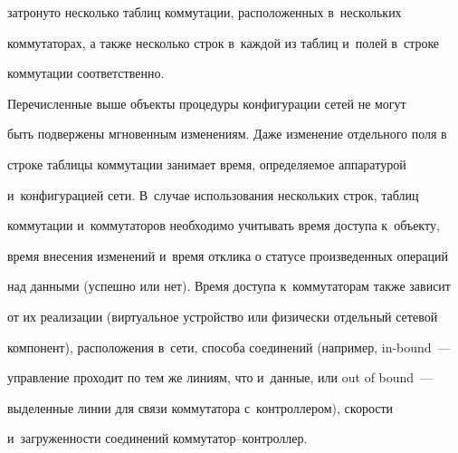 затронуто несколько таблиц коммутации, расположенных в~нескольких 


коммутаторах, а также несколько строк в~каждой из таблиц и~полей в~строке 


коммутации соответственно. 


     


     Перечисленные выше объекты процедуры конфигурации сетей не могут 


быть подвержены мгновенным изменениям. Даже изменение отдельного поля в~


строке таблицы коммутации занимает время, определяемое аппаратурой 


и~конфигурацией сети. В~случае использования нескольких строк, таблиц 


коммутации и~коммутаторов необходимо учитывать время доступа к~объекту, 


время внесения изменений и~время отклика о статусе произведенных операций 


над данными (успешно или нет). Время доступа к~коммутаторам также зависит 


от их реализации (виртуальное устройство или физически отдельный сетевой 


компонент), расположения в~сети, способа соединений (например, in-bound~--- 


управление проходит по тем же линиям, что и~данные, или out of bound~--- 


выделенные линии для связи коммутатора с~контроллером), скорости 


и~загруженности соединений ком\-му\-та\-тор--конт\-рол\-лер. 





